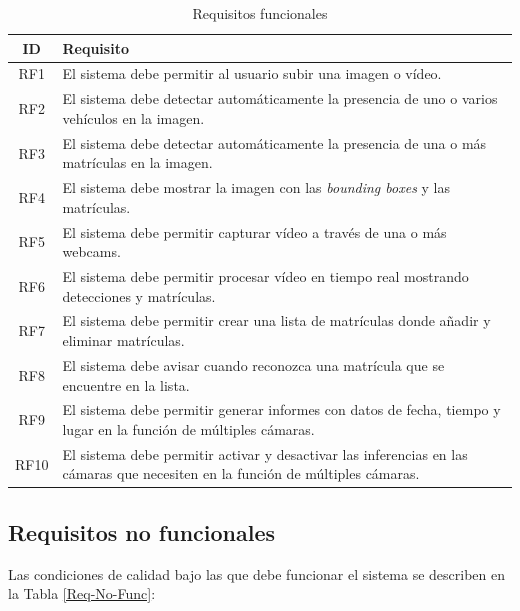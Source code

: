 \documentclass[12pt,a4paper,onecolumn,oneside]{report}
\begin{document}
\begin{table}[ht]
    \centering
    \caption{Requisitos funcionales}
    \begin{tabularx}{1\textwidth}{| c | >{\centering\arraybackslash}X |}
        \hline
        \textbf{ID} & \textbf{Requisito}\\
        \hline
        RF1 & El sistema debe permitir al usuario subir una imagen o vídeo.\\
        \hline
        RF2 & El sistema debe detectar automáticamente la presencia de uno o varios vehículos en la imagen.\\
        \hline
        RF3 & El sistema debe detectar automáticamente la presencia de una o más matrículas en la imagen.\\
        \hline
        RF4 & El sistema debe mostrar la imagen con las \textit{bounding boxes} y las matrículas.\\
        \hline
        RF5 & El sistema debe permitir capturar vídeo a través de una o más webcams.\\
        \hline
        RF6 & El sistema debe permitir procesar vídeo en tiempo real mostrando detecciones y matrículas.\\
        \hline
        RF7 & El sistema debe permitir crear una lista de matrículas donde añadir y eliminar matrículas.\\
        \hline
        RF8 & El sistema debe avisar cuando reconozca una matrícula que se encuentre en la lista.\\
        \hline 
        RF9 & El sistema debe permitir generar informes con datos de fecha, tiempo y lugar en la función de múltiples cámaras.\\
        \hline
        RF10 & El sistema debe permitir activar y desactivar las inferencias en las cámaras que necesiten en la función de múltiples cámaras.\\
        \hline
    \end{tabularx}
    \label{Req-Func}
\end{table}

\subsection{Requisitos no funcionales}

Las condiciones de calidad bajo las que debe funcionar el sistema se describen en la Tabla \ref{Req-No-Func}:
\end{document}
